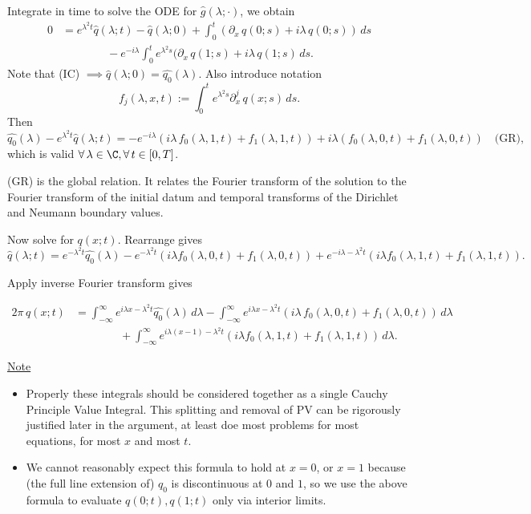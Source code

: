 Integrate in time to solve the ODE for $\widehat{g}(\lambda;\cdot)$, we obtain
\begin{align*}
    0 &= e^{\lambda^2t}\widehat{q}(\lambda;t) - \widehat{q}(\lambda;0) + \int_0^t(\partial_x\,q(0;s) + i\lambda\,q(0;s))\,ds \\
    &\qquad \qquad - e^{-i\lambda}\int_0^te^{\lambda^2s}(\partial_x\,q(1;s) + i\lambda\,q(1;s)\,ds.
\end{align*}
Note that (IC) $\implies \widehat{q}(\lambda;0) = \widehat{q_0}(\lambda)$. Also introduce notation \[f_j(\lambda,x,t) := \int_0^te^{\lambda^2s}\partial_x^j\,q(x;s)\,ds.\]
Then
\[\widehat{q_0}(\lambda) - e^{\lambda^2t}\widehat{q}(\lambda;t) = -e^{-i\lambda}\left(i\lambda\,f_0(\lambda,1,t) + f_1(\lambda,1,t)\right) + i\lambda(f_0(\lambda,0,t) + f_1(\lambda,0,t)) \quad \text{(GR)},\]
which is valid $\forall\,\lambda\in\C, \forall\, t\in[0,T]$.

(GR) is the global relation. It relates the Fourier transform of the solution to the Fourier transform of the initial datum and temporal transforms of the Dirichlet and Neumann boundary values.

Now solve for $q(x;t)$. Rearrange gives
\[\widehat{q}(\lambda;t) = e^{-\lambda^2t}\widehat{q_0}(\lambda) - e^{-\lambda^2t}(i\lambda f_0(\lambda,0,t) + f_1(\lambda,0,t)) + e^{-i\lambda - \lambda^2t}(i\lambda f_0(\lambda, 1, t) + f_1(\lambda,1,t)).\]

Apply inverse Fourier transform gives

\begin{align*}
  2\pi\,q(x;t) &= \int_{-\infty}^\infty e^{i\lambda x - \lambda^2 t}\widehat{q_0}(\lambda)\,d\lambda - \int_{-\infty}^\infty e^{i\lambda x - \lambda^2 t}(i\lambda\,f_0(\lambda,0,t)+f_1(\lambda,0,t))\,d\lambda \\
  &\qquad \qquad + \int_{-\infty}^\infty e^{i\lambda(x-1)-\lambda^2t}(i\lambda f_0(\lambda,1,t) + f_1(\lambda,1,t))\,d\lambda.
\end{align*}

\underline{Note} \begin{itemize}
    \item Properly these integrals should be considered together as a single Cauchy Principle Value Integral. This splitting and removal of PV can be rigorously justified later in the argument, at least doe most problems for most equations, for most $x$ and most $t$.
    \item We cannot reasonably expect this formula to hold at $x = 0$, or $x = 1$ because (the full line extension of) $q_0$ is discontinuous at $0$ and $1$, so we use the above formula to evaluate $q(0;t), q(1;t)$ only via interior limits. 
\end{itemize}
    
